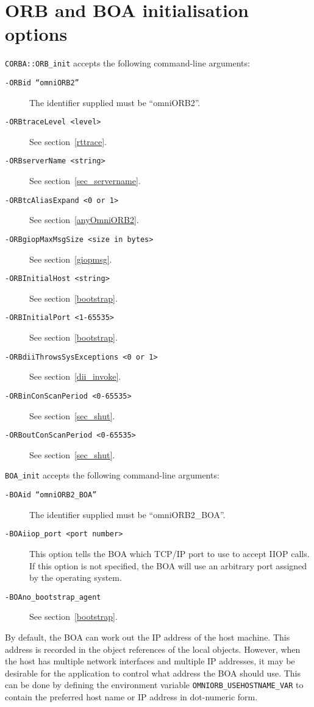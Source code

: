\documentclass[11pt,twoside,onecolumn]{book}
\begin{document}
\section{ORB and BOA initialisation options}
\label{omniorbapioptions}

{\tt CORBA::ORB\_init} accepts the following command-line arguments:

\begin{description}

\item[\tt -ORBid ``omniORB2''] The identifier supplied must be ``omniORB2''.
\item[\tt -ORBtraceLevel <level>] See section~\ref{rttrace}.
\item[\tt -ORBserverName <string>] See section~\ref{sec_servername}.
\item[\tt -ORBtcAliasExpand <0 or 1>] See section~\ref{anyOmniORB2}.
\item[\tt -ORBgiopMaxMsgSize <size in bytes>] See section~\ref{giopmsg}.
\item[\tt -ORBInitialHost <string>] See section~\ref{bootstrap}.
\item[\tt -ORBInitialPort <1-65535>] See section~\ref{bootstrap}.
\item[\tt -ORBdiiThrowsSysExceptions <0 or 1>] See section~\ref{dii_invoke}.
\item[\tt -ORBinConScanPeriod <0-65535>] See section~\ref{sec_shut}.
\item[\tt -ORBoutConScanPeriod <0-65535>] See section~\ref{sec_shut}.
\end{description}

{\tt BOA\_init} accepts the following command-line arguments:

\begin{description}

\item[\tt -BOAid ``omniORB2\_BOA''] The identifier supplied must be ``omniORB2\_BOA''.
\item[\tt -BOAiiop\_port <port number>] This option tells the BOA which
TCP/IP port to use to accept IIOP calls. If this option is not specified,
the BOA will use an arbitrary port assigned by the operating system.
\item[\tt -BOAno\_bootstrap\_agent] See section~\ref{bootstrap}.
\end{description}

By default, the BOA can work out the IP address of the host machine. This
address is recorded in the object references of the local objects.
However, when the host has multiple network interfaces and multiple IP
addresses, it may be desirable for the application to control what address
the BOA should use. This can be done by defining the environment variable
{\tt OMNIORB\_USEHOSTNAME\_VAR} to contain the preferred host name or IP
address in dot-numeric form.
\end{document}
